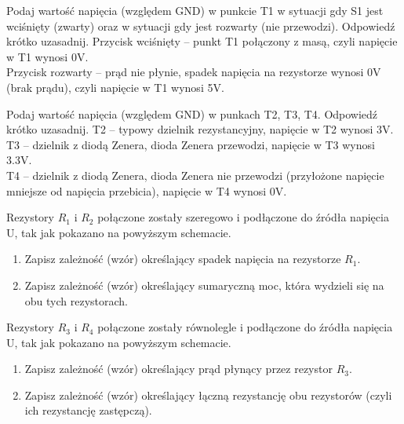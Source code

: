 \dbEntryCheckResults
Podaj wartość napięcia (względem GND) w punkcie T1 w sytuacji gdy S1 jest wciśnięty (zwarty) oraz w sytuacji gdy jest rozwarty (nie przewodzi). Odpowiedź krótko uzasadnij.
\fi
{}\dbEntryCheckResults
Przycisk wciśnięty – punkt T1 połączony z masą, czyli napięcie w T1 wynosi 0V.\\
Przycisk rozwarty – prąd nie płynie, spadek napięcia na rezystorze wynosi 0V (brak prądu), czyli napięcie w T1 wynosi 5V.
\fi

\dbEntryCheckResults
Podaj wartość napięcia (względem GND) w punkach T2, T3, T4. Odpowiedź krótko uzasadnij.
\fi
{}\dbEntryCheckResults
T2 – typowy dzielnik rezystancyjny, napięcie w T2 wynosi 3V.\\
T3 – dzielnik z diodą Zenera, dioda Zenera przewodzi, napięcie w T3 wynosi 3.3V.\\
T4 – dzielnik z diodą Zenera, dioda Zenera nie przewodzi (przyłożone napięcie mniejsze od napięcia przebicia), napięcie w T4 wynosi 0V.
\fi

\dbEntryCheckResults
  Rezystory $R_1$ i $R_2$ połączone zostały szeregowo i podłączone do źródła napięcia U, tak jak pokazano na powyższym schemacie.
  \begin{enumerate}[label=\alph*)]
    \item Zapisz zależność (wzór) określający spadek napięcia na rezystorze $R_1$.
    \item Zapisz zależność (wzór) określający sumaryczną moc, która wydzieli się na obu tych rezystorach.
  \end{enumerate}
\fi

\dbEntryCheckResults
  Rezystory $R_3$ i $R_4$ połączone zostały równolegle i podłączone do źródła napięcia U, tak jak pokazano na powyższym schemacie.
  \begin{enumerate}[label=\alph*)]
    \item Zapisz zależność (wzór) określający prąd płynący przez rezystor $R_3$.
    \item Zapisz zależność (wzór) określający łączną rezystancję obu rezystorów (czyli ich rezystancję zastępczą).
  \end{enumerate}
\fi

%
%

